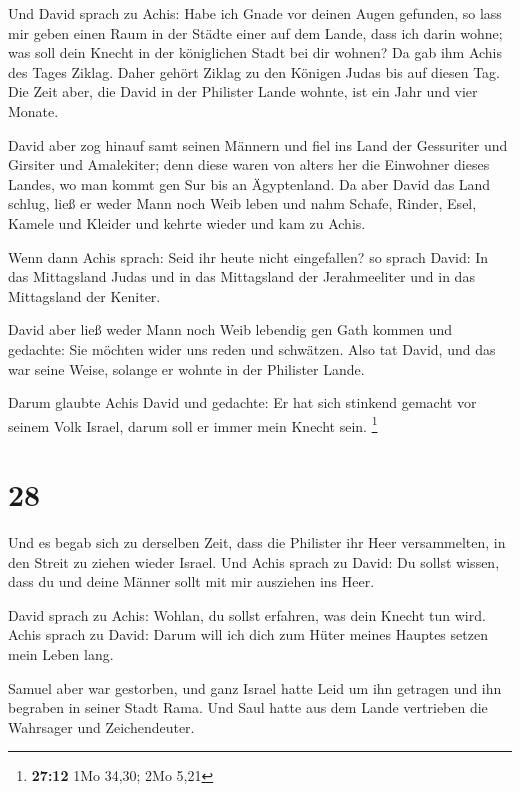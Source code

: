  Und David sprach zu Achis: Habe ich Gnade vor deinen Augen
gefunden, so lass mir geben einen Raum in der Städte einer auf dem
Lande, dass ich darin wohne; was soll dein Knecht in der königlichen
Stadt bei dir wohnen?  Da gab ihm Achis des Tages Ziklag.
Daher gehört Ziklag zu den Königen Judas bis auf diesen Tag.
 Die Zeit aber, die David in der Philister Lande wohnte, ist
ein Jahr und vier Monate.

 David aber zog hinauf samt seinen Männern und fiel ins Land
der Gessuriter und Girsiter und Amalekiter; denn diese waren von alters
her die Einwohner dieses Landes, wo man kommt gen Sur bis an
Ägyptenland.  Da aber David das Land schlug, ließ er weder
Mann noch Weib leben und nahm Schafe, Rinder, Esel, Kamele und Kleider
und kehrte wieder und kam zu Achis.

 Wenn dann Achis sprach: Seid ihr heute nicht eingefallen?
so sprach David: In das Mittagsland Judas und in das Mittagsland der
Jerahmeeliter und in das Mittagsland der Keniter.

 David aber ließ weder Mann noch Weib lebendig gen Gath
kommen und gedachte: Sie möchten wider uns reden und schwätzen. Also tat
David, und das war seine Weise, solange er wohnte in der Philister
Lande.

 Darum glaubte Achis David und gedachte: Er hat sich
stinkend gemacht vor seinem Volk Israel, darum soll er immer mein Knecht
sein. \footnote{\textbf{27:12} 1Mo 34,30; 2Mo 5,21}

\hypertarget{section-4}{%
\section{28}\label{section-4}}

 Und es begab sich zu derselben Zeit, dass die Philister ihr
Heer versammelten, in den Streit zu ziehen wieder Israel. Und Achis
sprach zu David: Du sollst wissen, dass du und deine Männer sollt mit
mir ausziehen ins Heer.

 David sprach zu Achis: Wohlan, du sollst erfahren, was dein
Knecht tun wird. Achis sprach zu David: Darum will ich dich zum Hüter
meines Hauptes setzen mein Leben lang.

 Samuel aber war gestorben, und ganz Israel hatte Leid um
ihn getragen und ihn begraben in seiner Stadt Rama. Und Saul hatte aus
dem Lande vertrieben die Wahrsager und Zeichendeuter.

